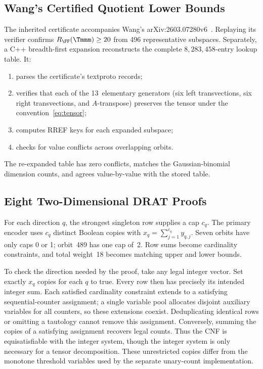 \documentclass[11pt,a4paper]{article}
\begin{document}
\subsection{Wang's Certified Quotient Lower Bounds}

The inherited certificate accompanies Wang's
arXiv:2603.07280v6~\cite{wangautomated}. Replaying its verifier confirms
$R_{\FF}(\Tmmm)\ge20$ from 496 representative subspaces.
Separately, a C++ breadth-first expansion reconstructs the complete
$8{,}283{,}458$-entry lookup table. It:
\begin{enumerate}
  \item parses the certificate's textproto records;
  \item verifies that each of the 13~elementary generators (six left transvections, six right transvections, and $A$-transpose) preserves the tensor under the convention~\eqref{eq:tensor};
  \item computes RREF keys for each expanded subspace;
  \item checks for value conflicts across overlapping orbits.
\end{enumerate}
The re-expanded table has zero conflicts, matches the Gaussian-binomial
dimension counts, and agrees value-by-value with the stored table.

\subsection{Eight Two-Dimensional DRAT Proofs}

For each direction $q$, the strongest singleton row supplies a cap $c_q$. The primary encoder uses $c_q$ distinct Boolean copies with $x_q=\sum_{j=1}^{c_q}y_{q,j}$. Seven orbits have only caps 0 or 1; orbit~489 has one cap of~2. Row sums become cardinality constraints, and total weight~18 becomes matching upper and lower bounds.

To check the direction needed by the proof, take any legal integer vector. Set exactly $x_q$ copies for each $q$ to true. Every row then has precisely its intended integer sum. Each satisfied cardinality constraint extends to a satisfying sequential-counter assignment; a single variable pool allocates disjoint auxiliary variables for all counters, so these extensions coexist. Deduplicating identical rows or omitting a tautology cannot remove this assignment. Conversely, summing the copies of a satisfying assignment recovers legal counts. Thus the CNF is equisatisfiable with the integer system, though the integer system is only necessary for a tensor decomposition. These unrestricted copies differ from the monotone threshold variables used by the separate unary-count implementation.
\end{document}
